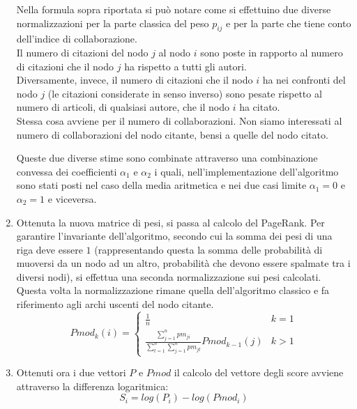 \documentclass[a4paper, 12pt]{article}
\begin{document}
\begin{enumerate}
  Nella formula sopra riportata si può notare come si effettuino due diverse normalizzazioni per la parte classica del peso $p_{ij}$ e per la parte che tiene conto dell'indice di collaborazione. \\
  Il numero di citazioni del nodo $j$ al nodo $i$ sono poste in rapporto al numero di citazioni che il nodo $j$ ha rispetto a tutti gli autori. \\
  Diversamente, invece, il numero di citazioni che il nodo $i$ ha nei confronti del nodo $j$ (le citazioni considerate in senso inverso) sono pesate rispetto al numero di articoli, di qualsiasi autore, che il nodo $i$ ha citato. \\
  Stessa cosa avviene per il numero di collaborazioni. Non siamo interessati al numero di collaborazioni del nodo citante, bensi a quelle del nodo citato.
  \par
  Queste due diverse stime sono combinate attraverso una combinazione convessa dei coefficienti $\alpha_1$ e $\alpha_2$ i quali, nell'implementazione dell'algoritmo sono stati posti nel caso della media aritmetica e nei due casi limite $\alpha_1 = 0$ e $\alpha_2 = 1$ e viceversa.  

  \item 
  Ottenuta la nuova matrice di pesi, si passa al calcolo del PageRank. Per garantire l'invariante dell'algoritmo, secondo cui la somma dei pesi di una riga deve essere $1$ (rappresentando questa la somma delle probabilità di muoversi da un nodo ad un altro, probabilità che devono essere spalmate tra i diversi nodi), si effettua una seconda normalizzazione sui pesi calcolati. Questa volta la normalizzazione rimane quella dell'algoritmo classico e fa riferimento agli archi uscenti del nodo citante.
  \[  
    Pmod_k(i) = 
    \begin{cases} 
      \displaystyle \frac{1}{n} & k = 1 \\
      \displaystyle \frac
        {\displaystyle \sum_{j=1}^{n} pm_{ji}}
        {\displaystyle \sum_{t=1}^{n} {\sum_{j=1}^{n} pm_{jt}}}
        Pmod_{k-1}(j) & k > 1 

    \end{cases} 
  \]
  
  \item
  Ottenuti ora i due vettori $P$ e $Pmod$ il calcolo del vettore degli score avviene attraverso la differenza logaritmica:
  \[
    S_i = log(P_i) - log(Pmod_i) 
  \]

\end{enumerate}
\end{document}
